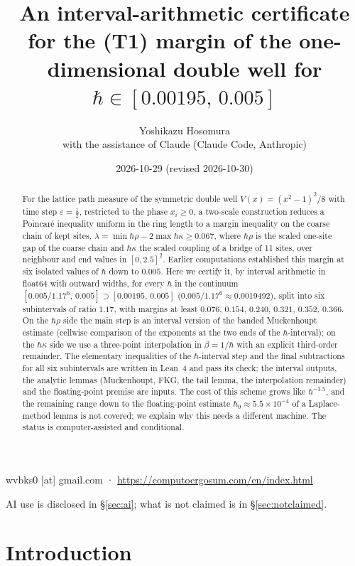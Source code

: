 \documentclass[11pt,a4paper]{article}
\title{An interval-arithmetic certificate for the (T1) margin of the one-dimensional double well for $\hbar\in[0.00195,\,0.005]$}
\author{Yoshikazu Hosomura\\[.3em]\normalsize with the assistance of Claude (Claude Code, Anthropic)}
\date{2026-10-29 (revised 2026-10-30)}
\theoremstyle{definition}
\theoremstyle{remark}
\newcommand{\hk}{\hbar\kappa}
\newcommand{\hr}{\hbar\rho}
\begin{document}
\maketitle
\begin{center}\small wvbks0 [at] gmail.com · \url{https://computoergosum.com/en/index.html}\end{center}
\begin{center}\small AI use is disclosed in \S\ref{sec:ai}; what is not claimed is in \S\ref{sec:notclaimed}.\end{center}

\begin{abstract}
For the lattice path measure of the symmetric double well $V(x)=(x^2-1)^2/8$ with time step $\varepsilon=\tfrac12$, restricted to the phase $x_i\ge0$, a two-scale construction reduces a Poincaré inequality uniform in the ring length to a margin inequality on the coarse chain of kept sites, $\lambda=\min\hr-2\max\hk\ge0.067$, where $\hr$ is the scaled one-site gap of the coarse chain and $\hk$ the scaled coupling of a bridge of 11 sites, over neighbour and end values in $[0,2.5]^2$. Earlier computations established this margin at six isolated values of $\hbar$ down to $0.005$. Here we certify it, by interval arithmetic in float64 with outward widths, for every $\hbar$ in the continuum $[0.005/1.17^6,\,0.005]\supset[0.00195,\,0.005]$ ($0.005/1.17^6\approx0.0019492$), split into six subintervals of ratio $1.17$, with margins at least $0.076$, $0.154$, $0.240$, $0.321$, $0.352$, $0.366$. On the $\hbar\rho$ side the main step is an interval version of the banded Muckenhoupt estimate (cellwise comparison of the exponents at the two ends of the $\hbar$-interval); on the $\hk$ side we use a three-point interpolation in $\beta=1/\hbar$ with an explicit third-order remainder. The elementary inequalities of the $\hbar$-interval step and the final subtractions for all six subintervals are written in Lean~4 and pass its check; the interval outputs, the analytic lemmas (Muckenhoupt, FKG, the tail lemma, the interpolation remainder) and the floating-point premise are inputs. The cost of this scheme grows like $\hbar^{-3.5}$, and the remaining range down to the floating-point estimate $\hbar_0\approx5.5\times10^{-4}$ of a Laplace-method lemma is not covered; we explain why this needs a different machine. The status is computer-assisted and conditional.
\end{abstract}

\section{Introduction}\label{sec:intro}
\end{document}
